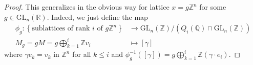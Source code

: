 \begin{proof}
    This generalizes in the obvious way for lattice $x = g\mathbb{Z}^n$ for some $g \in \text{GL}_n(\mathbb{R})$. Indeed, we just define
    the map
    \begin{align*}
        \phi_g \colon \left\lbrace\text{sublattices of rank $i$ of $g\mathbb{Z}^n$}\right\rbrace & \to \text{GL}_n(\mathbb{Z})/(Q_i(\mathbb{Q}) \cap \text{GL}_n(\mathbb{Z})) \\
        M_g = gM = g \bigoplus_{k=1}^i  \mathbb{Z}v_i                                            & \mapsto [\gamma]
    \end{align*}
    where $\gamma e_k = v_k$ in $\mathbb{Z}^n$ for all $ k \le i$ and $\phi_g^{-1}([\gamma]) = g \bigoplus_{k=1}^i  \mathbb{Z}(\gamma \cdot e_i)$.
\end{proof}
